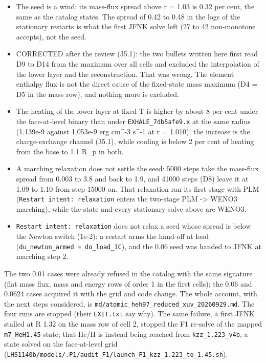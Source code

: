 \documentclass[english,a4paper]{my_memo}
\providecommand{\tightlist}{\setlength{\itemsep}{0pt}\setlength{\parskip}{0pt}}
\begin{document}
\begin{itemize}
\tightlist
\item
  The seed is a wind: its mass-flux spread above r = 1.03 is 0.32 per cent,
  the same as the catalog state\textquotesingle s. The spread of 0.42 to 0.48 in the logs of
  the stationary restarts is what the first JFNK solve left (27 to 42
  non-monotone accepts), not the seed.
\item
  CORRECTED after the review (35.1): the two bullets written here first
  read D9 to D14 from the maximum over all cells and excluded the
  interpolation of the lower layer and the reconstruction. That was wrong.
  The element enthalpy flux is not the direct cause of the fixed-state mass
  maximum (D4 = D5 in the mass row), and nothing more is excluded.
\item
  The heating of the lower layer at fixed T is higher by about 8 per cent
  under the face-at-level binary than under \texttt{EXHALE\_7db5afe9.x} at the same
  radius (1.139e-9 against 1.053e-9 erg cm\^{}-3 s\^{}-1 at r = 1.010); the
  increase is the charge-exchange channel (35.1), while cooling is below 2
  per cent of heating from the base to 1.1 R\_p in both.
\item
  A marching relaxation does not settle the seed: 5000 steps take the
  mass-flux spread from 0.003 to 3.8 and back to 1.9, and 41000 steps (D8)
  leave it at 1.09 to 1.10 from step 15000 on. That relaxation ran its first
  stage with PLM (\texttt{Restart\ intent:\ relaxation} enters the two-stage
  PLM -\textgreater{} WENO3 marching), while the state and every stationary solve above
  are WENO3.
\item
  \texttt{Restart\ intent:\ relaxation} does not relax a seed whose spread is below
  the Newton switch (1e-2): a restart arms the hand-off at load
  (\texttt{du\_newton\_armed\ =\ do\_load\_IC}), and the 0.06 seed was handed to JFNK at
  marching step 2.
\end{itemize}

The two 0.01 cases were already refused in the catalog with the same
signature (flat mass flux, mass and energy rows of order 1 in the first
cells); the 0.06 and 0.0624 cases acquired it with the grid and code change.
The whole account, with the next steps considered, is
\texttt{md/atomic\_heh97\_reduced\_xuv\_20260929.md}. The four runs are stopped (their
\texttt{EXIT.txt} say why). The same failure, a
first JFNK stalled at \textbar\textbar R\textbar\textbar{} 1.32 on the mass row of cell 2, stopped the F1
re-solve of the mapped \texttt{m7\_HeH1.45} state; that He/H is instead being reached
from \texttt{kzz\_1.223\_v4b}, a state solved on the face-at-level grid
(\texttt{LHS1140b/models/.P1/audit\_F1/launch\_F1\_kzz\_1.223\_to\_1.45.sh}).
\end{document}
